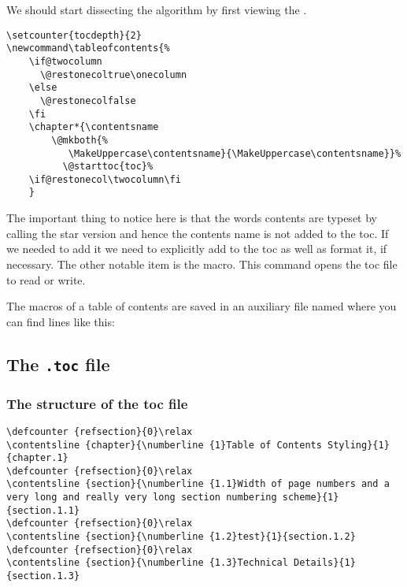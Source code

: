 We should start dissecting the algorithm by first viewing the .

\begin{tcolorbox}{}
\begin{lstlisting}
\setcounter{tocdepth}{2}
\newcommand\tableofcontents{%
    \if@twocolumn
      \@restonecoltrue\onecolumn
    \else
      \@restonecolfalse
    \fi
    \chapter*{\contentsname
        \@mkboth{%
           \MakeUppercase\contentsname}{\MakeUppercase\contentsname}}%
          \@starttoc{toc}%
    \if@restonecol\twocolumn\fi
    }
\end{lstlisting}
\end{tcolorbox}

The important thing to notice here is that the words contents are typeset by calling the star version and hence the contents name is not added to the toc. If we needed to add it we need to explicitly add to the toc as well as format it, if necessary. The other notable item is the  macro. This command opens the toc file to read or write.

The macros of a table of contents are saved in an auxiliary file named  where you can find lines like this:

\subsection{The \texttt{.toc} file}
\subsubsection{The structure of the toc file}
\begin{tcolorbox}[title=Extract from .toc file]
\begin{lstlisting}
\defcounter {refsection}{0}\relax
\contentsline {chapter}{\numberline {1}Table of Contents Styling}{1}{chapter.1}
\defcounter {refsection}{0}\relax
\contentsline {section}{\numberline {1.1}Width of page numbers and a very long and really very long section numbering scheme}{1}{section.1.1}
\defcounter {refsection}{0}\relax
\contentsline {section}{\numberline {1.2}test}{1}{section.1.2}
\defcounter {refsection}{0}\relax
\contentsline {section}{\numberline {1.3}Technical Details}{1}{section.1.3}
\end{lstlisting}
\end{tcolorbox}

